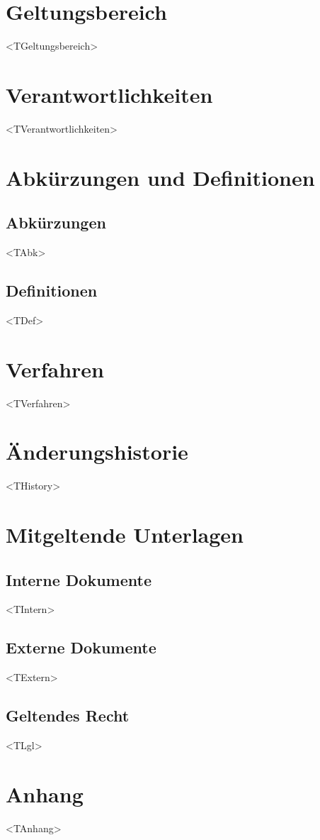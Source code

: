 \documentclass[a4paper,10pt,oneside,notitlepage]{article}
\begin{document}
\section{Geltungsbereich}
<TGeltungsbereich>


\section{Verantwortlichkeiten}
<TVerantwortlichkeiten>


\section{Abkürzungen und Definitionen}
\subsection{Abkürzungen}
<TAbk>

\subsection{Definitionen}
<TDef>

\section{Verfahren}
<TVerfahren>


\section{Änderungshistorie}
<THistory>

\section{Mitgeltende Unterlagen}
\subsection{Interne Dokumente}
<TIntern>
\subsection{Externe Dokumente}
<TExtern>
\subsection{Geltendes Recht}
<TLgl>

\newpage

\appendix
\section{Anhang}
<TAnhang>
\end{document}
